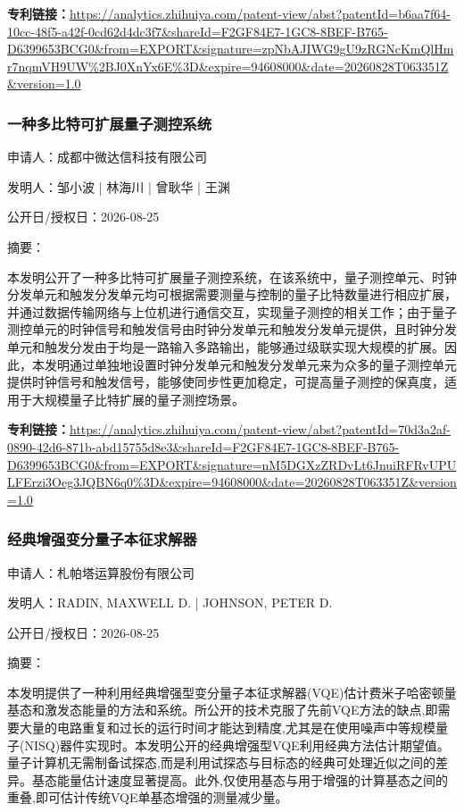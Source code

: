 \documentclass[12pt,a4paper]{ctexart}
\begin{document}
\noindent\textbf{专利链接：}\url{https://analytics.zhihuiya.com/patent-view/abst?patentId=b6aa7f64-10cc-48f5-a42f-0cd62d4dc3f7&shareId=F2GF84E7-1GC8-8BEF-B765-D6399653BCG0&from=EXPORT&signature=zpNbAJIWG9gU9zRGNcKmQlHmr7nqmVH9UW%2BJ0XnYx6E%3D&expire=94608000&date=20260828T063351Z&version=1.0}

\subsubsection{ 一种多比特可扩展量子测控系统 }

申请人：成都中微达信科技有限公司

发明人：邹小波 | 林海川 | 曾耿华 | 王渊

公开日/授权日：2026-08-25

摘要：

本发明公开了一种多比特可扩展量子测控系统，在该系统中，量子测控单元、时钟分发单元和触发分发单元均可根据需要测量与控制的量子比特数量进行相应扩展，并通过数据传输网络与上位机进行通信交互，实现量子测控的相关工作；由于量子测控单元的时钟信号和触发信号由时钟分发单元和触发分发单元提供，且时钟分发单元和触发分发由于均是一路输入多路输出，能够通过级联实现大规模的扩展。因此，本发明通过单独地设置时钟分发单元和触发分发单元来为众多的量子测控单元提供时钟信号和触发信号，能够使同步性更加稳定，可提高量子测控的保真度，适用于大规模量子比特扩展的量子测控场景。

\noindent\textbf{专利链接：}\url{https://analytics.zhihuiya.com/patent-view/abst?patentId=70d3a2af-0890-42d6-871b-abd15755d8e3&shareId=F2GF84E7-1GC8-8BEF-B765-D6399653BCG0&from=EXPORT&signature=nM5DGXzZRDvLt6JnuiRFRvUPULFErzi3Oeg3JQBN6q0%3D&expire=94608000&date=20260828T063351Z&version=1.0}

\subsubsection{ 经典增强变分量子本征求解器 }

申请人：札帕塔运算股份有限公司

发明人：RADIN, MAXWELL D. | JOHNSON, PETER D.

公开日/授权日：2026-08-25

摘要：

本发明提供了一种利用经典增强型变分量子本征求解器(VQE)估计费米子哈密顿量基态和激发态能量的方法和系统。所公开的技术克服了先前VQE方法的缺点,即需要大量的电路重复和过长的运行时间才能达到精度,尤其是在使用噪声中等规模量子(NISQ)器件实现时。本发明公开的经典增强型VQE利用经典方法估计期望值。量子计算机无需制备试探态,而是利用试探态与目标态的经典可处理近似之间的差异。基态能量估计速度显著提高。此外,仅使用基态与用于增强的计算基态之间的重叠,即可估计传统VQE单基态增强的测量减少量。
\end{document}
